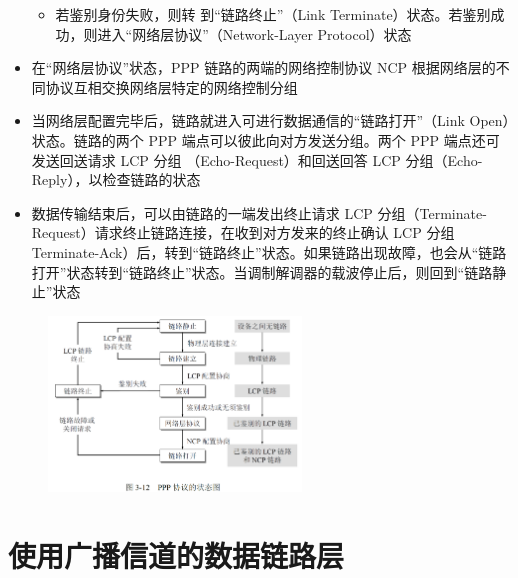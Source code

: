 \documentclass[cs4size,a4paper,10pt]{ctexart}
\begin{document}
\begin{itemize}
\begin{itemize}
			\item 若鉴别身份失败，则转 到“链路终止”（Link Terminate）状态。若鉴别成功，则进入“网络层协议”（Network-Layer Protocol）状态
		\end{itemize}
		\item 在“网络层协议”状态，PPP 链路的两端的网络控制协议 NCP 根据网络层的不同协议互相交换网络层特定的网络控制分组
		\item 当网络层配置完毕后，链路就进入可进行数据通信的“链路打开”（Link Open）状态。链路的两个 PPP 端点可以彼此向对方发送分组。两个 PPP 端点还可发送回送请求 LCP 分组 （Echo-Request）和回送回答 LCP 分组（Echo-Reply），以检查链路的状态
		\item 数据传输结束后，可以由链路的一端发出终止请求 LCP 分组（Terminate-Request）请求终止链路连接，在收到对方发来的终止确认 LCP 分组Terminate-Ack）后，转到“链路终止”状态。如果链路出现故障，也会从“链路打开”状态转到“链路终止”状态。当调制解调器的载波停止后，则回到“链路静止”状态
	\end{itemize}

	\begin{figure}[H]
		\centering
		\includegraphics[width=0.6\textwidth]{img/3.12}
	\end{figure}

	\section{使用广播信道的数据链路层}
\end{document}
